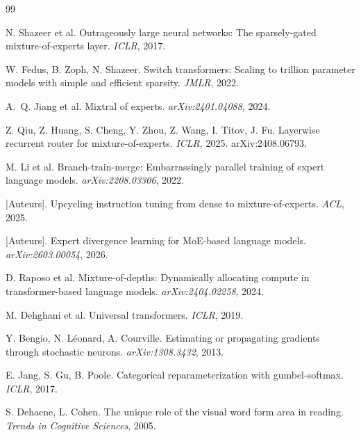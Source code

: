 \documentclass[10pt,a4paper]{article}
\begin{document}

\begin{thebibliography}{99}

N. Shazeer et al.
\newblock Outrageously large neural networks: The sparsely-gated mixture-of-experts layer.
\newblock \textit{ICLR}, 2017.

W. Fedus, B. Zoph, N. Shazeer.
\newblock Switch transformers: Scaling to trillion parameter models with simple and efficient sparsity.
\newblock \textit{JMLR}, 2022.

A.~Q. Jiang et al.
\newblock Mixtral of experts.
\newblock \textit{arXiv:2401.04088}, 2024.

Z. Qiu, Z. Huang, S. Cheng, Y. Zhou, Z. Wang, I. Titov, J. Fu.
\newblock Layerwise recurrent router for mixture-of-experts.
\newblock \textit{ICLR}, 2025. arXiv:2408.06793.

M. Li et al.
\newblock Branch-train-merge: Embarrassingly parallel training of expert language models.
\newblock \textit{arXiv:2208.03306}, 2022.

[Auteurs].
\newblock Upcycling instruction tuning from dense to mixture-of-experts.
\newblock \textit{ACL}, 2025.

[Auteurs].
\newblock Expert divergence learning for MoE-based language models.
\newblock \textit{arXiv:2603.00054}, 2026.

D. Raposo et al.
\newblock Mixture-of-depths: Dynamically allocating compute in transformer-based language models.
\newblock \textit{arXiv:2404.02258}, 2024.

M. Dehghani et al.
\newblock Universal transformers.
\newblock \textit{ICLR}, 2019.

Y. Bengio, N. Léonard, A. Courville.
\newblock Estimating or propagating gradients through stochastic neurons.
\newblock \textit{arXiv:1308.3432}, 2013.

E. Jang, S. Gu, B. Poole.
\newblock Categorical reparameterization with gumbel-softmax.
\newblock \textit{ICLR}, 2017.

S. Dehaene, L. Cohen.
\newblock The unique role of the visual word form area in reading.
\newblock \textit{Trends in Cognitive Sciences}, 2005.

\end{thebibliography}
\end{document}
